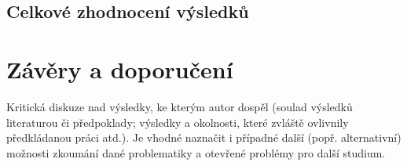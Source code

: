 
\subsection{Celkové zhodnocení výsledků}\label{subsec:celkove-zhodnoceni-vysledku}


\section{Závěry a doporučení}\label{sec:zavery-a-doporuceni}


Kritická diskuze nad výsledky, ke kterým autor dospěl (soulad výsledků  literaturou či předpoklady;
výsledky a okolnosti, které zvláště ovlivnily předkládanou práci atd.).
Je vhodné naznačit i případné další
(popř. alternativní) možnosti zkoumání dané problematiky a otevřené problémy pro další studium.








